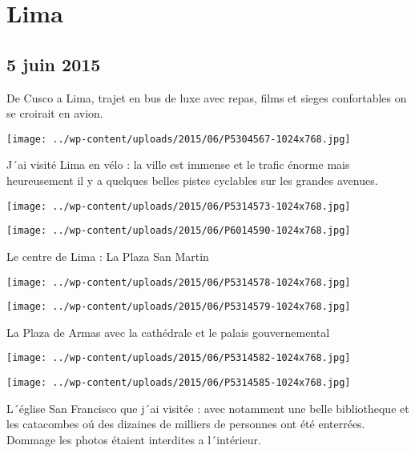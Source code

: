 \chapter{Lima}
\section*{5 juin 2015}
De Cusco a Lima, trajet en bus de luxe avec repas, films et sieges confortables on se croirait en avion. \newline
 \newline
\centerline{\texttt{[image: ../wp-content/uploads/2015/06/P5304567-1024x768.jpg]} } 
 \newline
 J´ai visité Lima en vélo : la ville est immense et le trafic énorme mais heureusement il y a quelques belles pistes cyclables sur les grandes avenues. \newline
 \newline
\centerline{\texttt{[image: ../wp-content/uploads/2015/06/P5314573-1024x768.jpg]} } 
 \newline
 \newline
\centerline{\texttt{[image: ../wp-content/uploads/2015/06/P6014590-1024x768.jpg]} } 
 \newline
 Le centre de Lima : \newline
 La Plaza San Martin \newline
 \newline
\centerline{\texttt{[image: ../wp-content/uploads/2015/06/P5314578-1024x768.jpg]} } 
 \newline
 \newline
\centerline{\texttt{[image: ../wp-content/uploads/2015/06/P5314579-1024x768.jpg]} } 
 \newline
 La Plaza de Armas avec la cathédrale et le palais gouvernemental \newline
 \newline
\centerline{\texttt{[image: ../wp-content/uploads/2015/06/P5314582-1024x768.jpg]} } 
 \newline
 \newline
\centerline{\texttt{[image: ../wp-content/uploads/2015/06/P5314585-1024x768.jpg]} } 
 \newline
 L´église San Francisco que j´ai visitée : avec notamment une belle bibliotheque et les catacombes oú des dizaines de milliers de personnes ont été enterrées. Dommage les photos étaient interdites a l´intérieur. \newline
